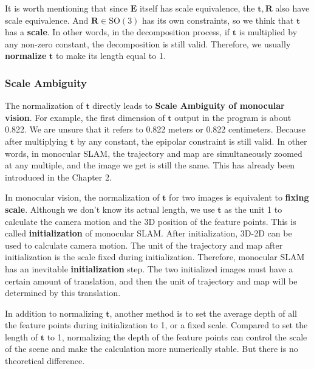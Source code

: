 It is worth mentioning that since $\mathbf{E}$ itself has scale equivalence, the $\mathbf{t}, \mathbf{R}$ also have scale equivalence. And $\mathbf{R} \in \mathrm{SO}(3)$ has its own constraints, so we think that $\mathbf{t}$ has a \textbf{scale}. In other words, in the decomposition process, if $\mathbf{t}$ is multiplied by any non-zero constant, the decomposition is still valid. Therefore, we usually \textbf{normalize} $\mathbf{t}$ to make its length equal to 1.

\subsubsection{Scale Ambiguity}
The normalization of $\mathbf{t}$ directly leads to \textbf{Scale Ambiguity of monocular vision}. For example, the first dimension of $\mathbf{t}$ output in the program is about 0.822. We are unsure that it refers to 0.822 meters or 0.822 centimeters. Because after multiplying $\mathbf{t}$ by any constant, the epipolar constraint is still valid. In other words, in monocular SLAM, the trajectory and map are simultaneously zoomed at any multiple, and the image we get is still the same. This has already been introduced in the Chapter 2.

In monocular vision, the normalization of $\mathbf{t}$ for two images is equivalent to \textbf{fixing scale}. Although we don't know its actual length, we use $\mathbf{t}$ as the unit 1 to calculate the camera motion and the 3D position of the feature points. This is called \textbf{initialization} of monocular SLAM. After initialization, 3D-2D can be used to calculate camera motion. The unit of the trajectory and map after initialization is the scale fixed during initialization. Therefore, monocular SLAM has an inevitable \textbf{initialization} step. The two initialized images must have a certain amount of translation, and then the unit of trajectory and map will be determined by this translation.

In addition to normalizing $\mathbf{t}$, another method is to set the average depth of all the feature points during initialization to 1, or a fixed scale. Compared to set the length of $\mathbf{t}$ to 1, normalizing the depth of the feature points can control the scale of the scene and make the calculation more numerically stable. But there is no theoretical difference.

